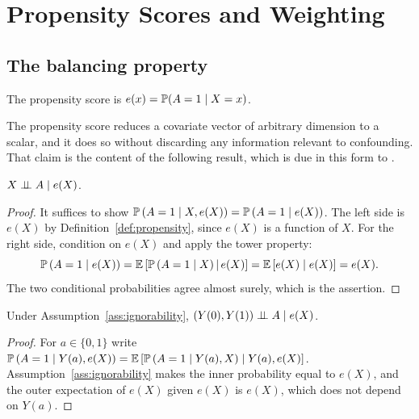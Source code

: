 \chapter{Propensity Scores and Weighting}
\label{chap:propensity}

\section{The balancing property}
\label{sec:ps-balancing}

\begin{definition}
\label{def:propensity}
The propensity score is $e(x) = \mathbb{P}(A = 1 \mid X = x)$.
\end{definition}

The propensity score reduces a covariate vector of arbitrary dimension to a
scalar, and it does so without discarding any information relevant to
confounding. That claim is the content of the following result, which is due in this form
to \citet{marchetti2004balancing}.

\begin{theorem}
\label{thm:balancing}
$X \perp\!\!\!\perp A \mid e(X)$.
\end{theorem}

\begin{proof}
It suffices to show $\mathbb{P}\left( A = 1 \mid X, e(X) \right) = \mathbb{P}\left( A = 1 \mid e(X) \right)$.
The left side is $e(X)$ by Definition~\ref{def:propensity}, since $e(X)$ is a
function of $X$. For the right side, condition on $e(X)$ and apply the tower
property:
\begin{equation*}
  \mathbb{P}\left( A = 1 \mid e(X) \right)
    = \mathbb{E}\left[ \mathbb{P}\left( A = 1 \mid X \right) \,\middle|\, e(X) \right]
    = \mathbb{E}\left[ e(X) \mid e(X) \right]
    = e(X).
\end{equation*}
The two conditional probabilities agree almost surely, which is the assertion.
\end{proof}

\begin{corollary}
\label{cor:ps-ignorability}
Under Assumption~\ref{ass:ignorability},
$\left( Y(0), Y(1) \right) \perp\!\!\!\perp A \mid e(X)$.
\end{corollary}

\begin{proof}
For $a \in \{0,1\}$ write
$\mathbb{P}\left( A = 1 \mid Y(a), e(X) \right) = \mathbb{E}\left[ \mathbb{P}\left( A = 1 \mid Y(a), X \right) \mid Y(a), e(X) \right]$.
Assumption~\ref{ass:ignorability} makes the inner probability equal to $e(X)$,
and the outer expectation of $e(X)$ given $e(X)$ is $e(X)$, which does not
depend on $Y(a)$.
\end{proof}

